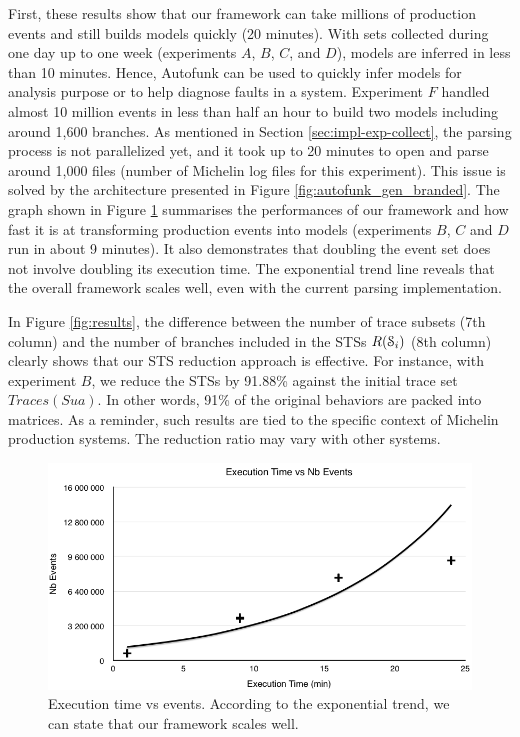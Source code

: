 First, these results show that our framework can take millions
of production events and still builds models quickly (20
minutes). With sets collected during one day up to one week
(experiments $A$, $B$, $C$, and $D$), models are inferred in less
than 10 minutes. Hence, Autofunk can be used to quickly infer
models for analysis purpose or to help diagnose faults in a
system. Experiment $F$ handled almost 10 million events in less
than half an hour to build two models including around 1,600
branches. As mentioned in Section \ref{sec:impl-exp-collect}, the
parsing process is not parallelized yet, and it took up to 20
minutes to open and parse around 1,000 files (number of Michelin
log files for this experiment). This issue is solved by the
architecture presented in Figure \ref{fig:autofunk_gen_branded}.
The graph shown in Figure \ref{fig:time-vs-messages} summarises
the performances of our framework and how fast it is at
transforming production events into models (experiments $B$, $C$
and $D$ run in about 9 minutes). It also demonstrates that
doubling the event set does not involve doubling its execution
time. The exponential trend line reveals that the overall
framework scales well, even with the current parsing
implementation.

In Figure \ref{fig:results}, the difference between the number of
trace subsets (7th column) and the number of branches included in
the STSs $R(\EuScript{S}_i)$ (8th column) clearly shows that our
STS reduction approach is effective. For instance, with
experiment $B$, we reduce the STSs by 91.88\% against the initial
trace set $Traces(Sua)$. In other words, 91\% of the original
behaviors are packed into matrices. As a reminder, such results
are tied to the specific context of Michelin production systems.
The reduction ratio may vary with other systems.

\begin{figure}[ht]
  \includegraphics[width=1.0\linewidth]{figures/time-vs-messages.png}

  \caption{Execution time vs events. According to the exponential
  trend, we can state that our framework scales well.}
  \label{fig:time-vs-messages}
\end{figure}

